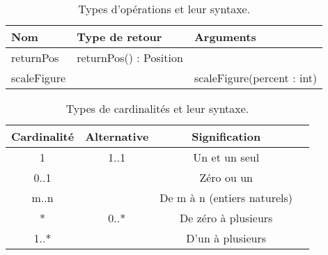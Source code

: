 \begin{table}[H]
	\centering
	\caption{Types d'opérations et leur syntaxe.}
	\begin{adjustbox}{max width = \textwidth}
\begin{tabular}{p{3cm}p{5cm}p{3cm}}
\toprule
Nom & Type de retour & Arguments \\
\midrule
returnPos & returnPos() : Position & \\
scaleFigure & & scaleFigure(percent : int) \\
\bottomrule
\end{tabular}
	\end{adjustbox}
\end{table}


\begin{table}[H]
	\centering
	\caption{Types de cardinalités et leur syntaxe.}
	\begin{adjustbox}{max width = \textwidth}
		\begin{tabular}{cccc}
			\toprule
			Cardinalité & Alternative & Signification \\
			\midrule
			1 & 1..1 & Un et un seul \\
			0..1 & & Zéro ou un \\
			m..n& & De m à n (entiers naturels) \\
			* & 0..* & De zéro à plusieurs \\
			1..*&  & D'un à plusieurs \\
			\bottomrule
		\end{tabular}
	\end{adjustbox}
\end{table}



